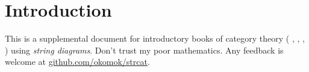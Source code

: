 \section{Introduction}


This is a supplemental document for introductory books of category theory %
(\cite{AdamekHerrlichStrecker200908}%
, \cite{Awodey201008}%
, \cite{Borceux200804}%
, \cite{Lane201011}%
) using \emph{string diagrams}. %
Don't trust my poor mathematics. Any feedback is welcome at %
\href{https://github.com/okomok/strcat}{github.com/okomok/strcat}.  
